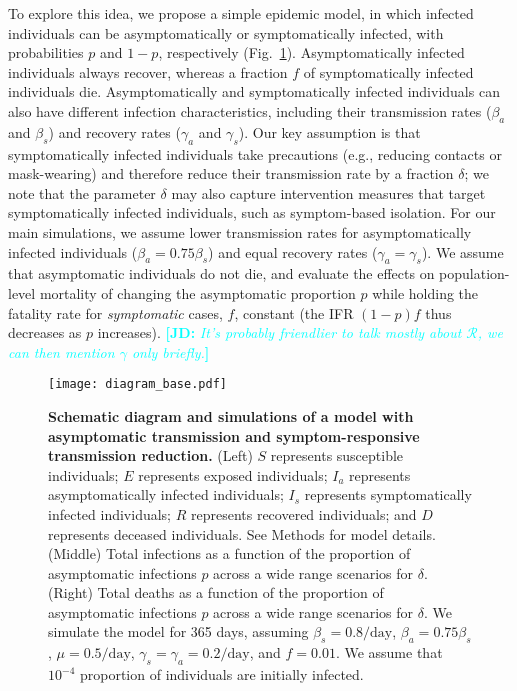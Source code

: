 \documentclass[12pt]{article}
\newcommand{\comment}{\showcomment}
\newcommand{\showcomment}[3]{\textcolor{#1}{\textbf{[#2: }\textsl{#3}\textbf{]}}}
\newcommand{\jd}[1]{\comment{cyan}{JD}{#1}}
\newcommand{\fref}[1]{Fig.~\ref{fig:#1}}
\newcommand{\RR}{\ensuremath{{\mathcal R}}\xspace}
\begin{document}
To explore this idea, we propose a simple epidemic model,
in which infected individuals can be asymptomatically or symptomatically infected, with probabilities $p$ and $1-p$, respectively (\fref{base}).  
Asymptomatically infected individuals always recover, whereas a fraction $f$ of symptomatically infected individuals die.
Asymptomatically and symptomatically infected individuals can also have different infection characteristics, including their transmission rates ($\beta_a$ and $\beta_s$) and recovery rates ($\gamma_a$ and $\gamma_s$).
Our key assumption is that symptomatically infected individuals take precautions (e.g., reducing contacts or mask-wearing) and therefore reduce their transmission rate by a fraction $\delta$;
we note that the parameter $\delta$ may also capture intervention measures that target symptomatically infected individuals, such as symptom-based isolation. 
For our main simulations, we assume lower transmission rates for asymptomatically infected individuals ($\beta_a = 0.75 \beta_s$) and equal recovery rates ($\gamma_a = \gamma_s$).
We assume that asymptomatic individuals do not die, and evaluate the effects on population-level mortality of changing the asymptomatic proportion $p$ while holding the fatality rate for \emph{symptomatic} cases, $f$, constant (the IFR $(1-p)f$ thus decreases as $p$ increases).
\jd{It's probably friendlier to talk mostly about \RR, we can then mention $\gamma$ only briefly.}

\begin{figure}[!ht]
\texttt{[image: diagram\_base.pdf]}
\caption{
\textbf{Schematic diagram and simulations of a model with asymptomatic transmission and symptom-responsive transmission reduction.}
(Left) $S$ represents susceptible individuals; $E$ represents exposed individuals; $I_a$ represents asymptomatically infected individuals; $I_s$ represents symptomatically infected individuals; $R$ represents recovered individuals; and $D$ represents deceased individuals. See Methods for model details.
(Middle) Total infections as a function of the proportion of asymptomatic infections $p$ across a wide range scenarios for $\delta$.
(Right) Total deaths as a function of the proportion of asymptomatic infections $p$ across a wide range scenarios for $\delta$.
We simulate the model for 365 days, assuming $\beta_s = 0.8/\mathrm{day}$, $\beta_a = 0.75 \beta_s$, $\mu=0.5/\mathrm{day}$, $\gamma_s=\gamma_a=0.2/\mathrm{day}$, and $f=0.01$.
We assume that $10^{-4}$ proportion of individuals are initially infected.
}
\label{fig:base}
\end{figure}
\end{document}
